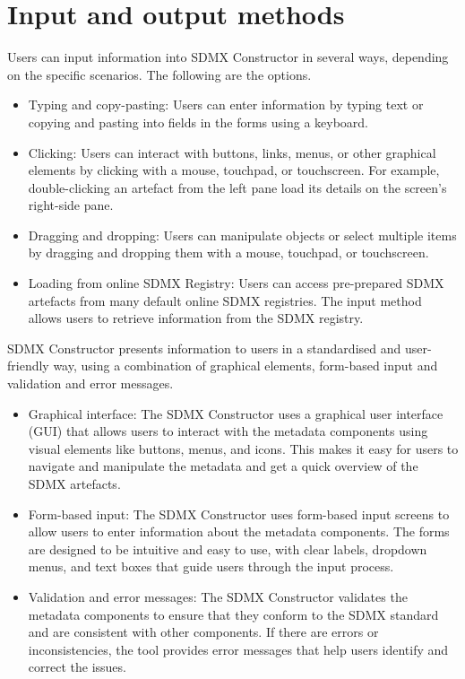 \documentclass[
]{book}
\providecommand{\tightlist}{%
  \setlength{\itemsep}{0pt}\setlength{\parskip}{0pt}}
\begin{document}
\hypertarget{input-and-output-methods}{%
\section{Input and output methods}\label{input-and-output-methods}}

Users can input information into SDMX Constructor in several ways, depending on the specific scenarios. The following are the options.

\begin{itemize}
\tightlist
\item
  Typing and copy-pasting: Users can enter information by typing text or copying and pasting into fields in the forms using a keyboard.
\item
  Clicking: Users can interact with buttons, links, menus, or other graphical elements by clicking with a mouse, touchpad, or touchscreen. For example, double-clicking an artefact from the left pane load its details on the screen's right-side pane.
\item
  Dragging and dropping: Users can manipulate objects or select multiple items by dragging and dropping them with a mouse, touchpad, or touchscreen.
\item
  Loading from online SDMX Registry: Users can access pre-prepared SDMX artefacts from many default online SDMX registries. The input method allows users to retrieve information from the SDMX registry.
\end{itemize}

SDMX Constructor presents information to users in a standardised and user-friendly way, using a combination of graphical elements, form-based input and validation and error messages.

\begin{itemize}
\tightlist
\item
  Graphical interface: The SDMX Constructor uses a graphical user interface (GUI) that allows users to interact with the metadata components using visual elements like buttons, menus, and icons. This makes it easy for users to navigate and manipulate the metadata and get a quick overview of the SDMX artefacts.
\item
  Form-based input: The SDMX Constructor uses form-based input screens to allow users to enter information about the metadata components. The forms are designed to be intuitive and easy to use, with clear labels, dropdown menus, and text boxes that guide users through the input process.
\item
  Validation and error messages: The SDMX Constructor validates the metadata components to ensure that they conform to the SDMX standard and are consistent with other components. If there are errors or inconsistencies, the tool provides error messages that help users identify and correct the issues.
\end{itemize}
\end{document}
